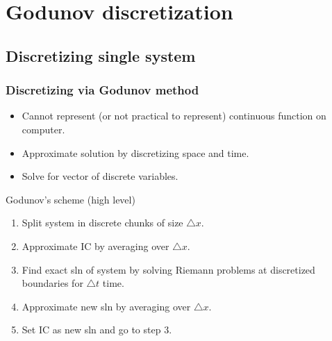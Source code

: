 \section[godunov]{Godunov discretization} %
\label{sec:godunov_discretization}

\subsection{Discretizing single system} %
\label{sub:discretizing_single_system}


\begin{frame}
\frametitle{Discretizing via Godunov method}

\begin{itemize}
    \item Cannot represent (or not practical to represent) continuous function on computer.
    \item Approximate solution by discretizing space and time.
    \item Solve for vector of discrete variables.
\end{itemize}

\begin{block}{Godunov's scheme (high level)}
\begin{enumerate}
    \item Split system in discrete chunks of size $\triangle x$.
    \item Approximate IC by averaging over $\triangle x$.
    \item Find exact sln of system by solving Riemann problems at discretized boundaries for $\triangle t$ time.
    \item Approximate new sln by averaging over $\triangle x$.
    \item Set IC as new sln and go to step 3.
\end{enumerate}
\end{block}

\end{frame}

